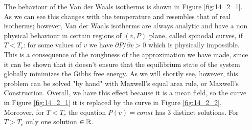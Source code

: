 \documentclass[../../Main/Main.tex]{subfiles}
\begin{document}
The behaviour of the Van der Waals isotherms is shown in Figure \ref{fig:14_2_1}. As we can see this changes with the temperature and resembles that of real isotherms; however, Van der Waals isotherms are always analytic and have a non physical behaviour in certain regions of \( (v,P)\) plane, called spinodal curves, if \( T < T_c\): for some values of \(v\) we have \( \partial P / \partial v >0\) which is physically impossible. This is a consequence of the roughness of the approximation we have made, since it can be shown that it doesn't ensure that the equilibrium state of the system globally minimizes the Gibbs free energy. As we will shortly see, however, this problem can be solved "by hand" with Maxwell's equal area rule, or Maxwell's Construction. Overall, we have this effect because it is a mean field, so the curve in Figure \ref{fig:14_2_1} it is replaced by the curve in Figure \ref{fig:14_2_2}.
Moreover, for \( T < T_c \) the equation \( P(v) = const \) has 3 distinct solutions. For \( T > T_c \) only one solution \( \in \mathbb{R} \).
\end{document}

